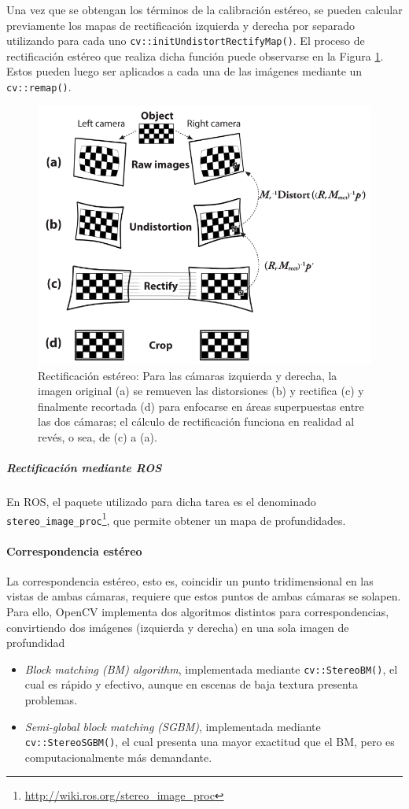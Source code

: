 Una vez que se obtengan los términos de la calibración estéreo, se pueden calcular previamente los mapas de rectificación izquierda y derecha por separado utilizando para cada uno \texttt{cv::initUndistortRectifyMap()}. El proceso de rectificación estéreo que realiza dicha función puede observarse en la Figura \ref{fig:stereorectification}. Estos pueden luego ser aplicados a cada una de las imágenes mediante un \texttt{cv::remap()}.
\begin{figure}
    \centering
    \includegraphics[width=\linewidth]{Img/StereoRectification.png}
    \caption{Rectificación estéreo: Para las cámaras izquierda y derecha, la imagen original (a) se remueven las distorsiones (b) y rectifica (c) y finalmente recortada (d) para enfocarse en áreas superpuestas entre las dos cámaras; el cálculo de rectificación funciona en realidad al revés, o sea, de (c) a (a).}
    \label{fig:stereorectification}
\end{figure}

\subparagraph{Rectificación mediante ROS}
En ROS, el paquete utilizado para dicha tarea es el denominado \texttt{stereo\_image\_proc}\footnote{\url{http://wiki.ros.org/stereo_image_proc}}, que permite obtener un mapa de profundidades.

\paragraph{Correspondencia estéreo}
La correspondencia estéreo, esto es, coincidir un punto tridimensional en las vistas de ambas cámaras, requiere que estos puntos de ambas cámaras se solapen. Para ello, OpenCV implementa dos algoritmos distintos para correspondencias, convirtiendo dos imágenes (izquierda y derecha) en una sola imagen de profundidad
\begin{itemize}
    \item \textit{Block matching (BM) algorithm}, implementada mediante \texttt{cv::StereoBM()}, el cual es rápido y efectivo, aunque en escenas de baja textura presenta problemas. 
    \item \textit{Semi-global block matching (SGBM)}, implementada mediante \texttt{cv::StereoSGBM()}, el cual presenta una mayor exactitud que el BM, pero es computacionalmente más demandante.
\end{itemize}

